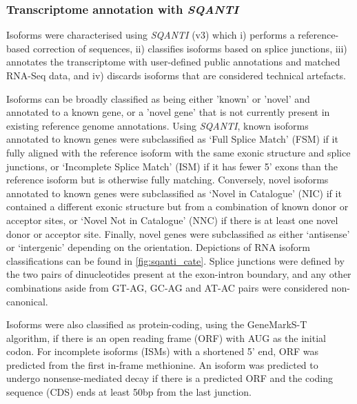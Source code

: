 \subsubsection{Transcriptome annotation with \textit{SQANTI}}
\label{section: sqanti_annotations}
Isoforms were characterised using \textit{SQANTI}\cite{Tardaguila2018} (v3) which i) performs a reference-based correction of sequences, ii) classifies isoforms based on splice junctions, iii) annotates the transcriptome with user-defined public annotations and matched RNA-Seq data, and iv) discards isoforms that are considered technical artefacts. 

Isoforms can be broadly classified as being either 'known' or 'novel' and annotated to a known gene, or a 'novel gene' that is not currently present in existing reference genome annotations. Using \textit{SQANTI}, known isoforms annotated to known genes were subclassified as ‘Full Splice Match' (FSM) if it fully aligned with the reference isoform with the same exonic structure and splice junctions, or ‘Incomplete Splice Match' (ISM) if it has fewer 5’ exons than the reference isoform but is otherwise fully matching. Conversely, novel isoforms annotated to known genes were subclassified as ‘Novel in Catalogue' (NIC) if it contained a different exonic structure but from a combination of known donor or acceptor sites, or ‘Novel Not in Catalogue' (NNC) if there is at least one novel donor or acceptor site. Finally, novel genes were subclassified as either ‘antisense' or ‘intergenic' depending on the orientation. Depictions of RNA isoform classifications can be found in \cref{fig:sqanti_cate}. Splice junctions were defined by the two pairs of dinucleotides present at the exon-intron boundary, and any other combinations aside from GT-AG, GC-AG and AT-AC pairs were considered non-canonical. 

Isoforms were also classified as protein-coding, using the GeneMarkS-T algorithm\cite{Tang2015}, if there is an open reading frame (ORF) with AUG as the initial codon. For incomplete isoforms (ISMs) with a shortened 5' end, ORF was predicted from the first in-frame methionine. An isoform was predicted to undergo nonsense-mediated decay if there is a predicted ORF and the coding sequence (CDS) ends at least 50bp from the last junction. 


